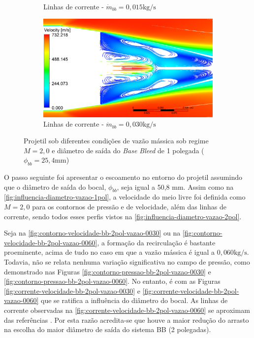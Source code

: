 \begin{figure}[!ht]
\begin{subfigure}[b]{0.47\textwidth}
        \caption{Linhas de corrente - $\Dot{m}_{bb} = 0,015 \unit{\kg/\s}$}
        \label{fig:corrente-velocidade-bb-1pol-vazao0015}
    \end{subfigure}
    \hfill
    \begin{subfigure}[b]{0.47\textwidth}
        \centering
        \includegraphics[width=\textwidth]{corrente-velocidade-2306K-vazao-0030-1pol.png}
        \caption{Linhas de corrente - $\Dot{m}_{bb} = 0,030 \unit{\kg/\s}$}
        \label{fig:corrente-velocidade-bb-1pol-vazao0030}
    \end{subfigure}
	\caption{Projetil sob diferentes condições de vazão mássica sob regime $M = 2,0$ e diâmetro de saída do \textit{Base Bleed} de 1 polegada ($\phi_{bb} = 25,4 \unit{\mm}$)}
	\label{fig:influencia-diametro-vazao-1pol}
\end{figure}

O passo seguinte foi apresentar o escoamento no entorno do projetil assumindo que o diâmetro de saída do bocal, $\phi_{bb}$, seja igual a 50,8 mm. Assim como na \autoref{fig:influencia-diametro-vazao-1pol}, a velocidade do meio livre foi definida como $M = 2,0$ para os contornos de pressão e de velocidade, além das linhas de corrente, sendo todos esses perfis vistos na \autoref{fig:influencia-diametro-vazao-2pol}.

Seja na \autoref{fig:contorno-velocidade-bb-2pol-vazao-0030} ou na \autoref{fig:contorno-velocidade-bb-2pol-vazao-0060}, a formação da recirculação é bastante proeminente, acima de tudo no caso em que a vazão mássica é igual a $0,060 \unit{\kg/\s}$. Todavia, não se relata nenhuma variação significativa no campo de pressão, como demonstrado nas Figuras \ref{fig:contorno-pressao-bb-2pol-vazao-0030} e \ref{fig:contorno-pressao-bb-2pol-vazao-0060}. No entanto, é com as Figuras \ref{fig:corrente-velocidade-bb-2pol-vazao-0030} e \ref{fig:corrente-velocidade-bb-2pol-vazao-0060} que se ratifica a influência do diâmetro do bocal. As linhas de corrente observadas na \autoref{fig:corrente-velocidade-bb-2pol-vazao-0060} se aproximam das referências \cite{Sahu1985,Mahmoud2009,Lucena2020}. Por esta razão acredita-se que houve a maior redução do arrasto na escolha do maior diâmetro de saída do sistema BB (2 polegadas).

